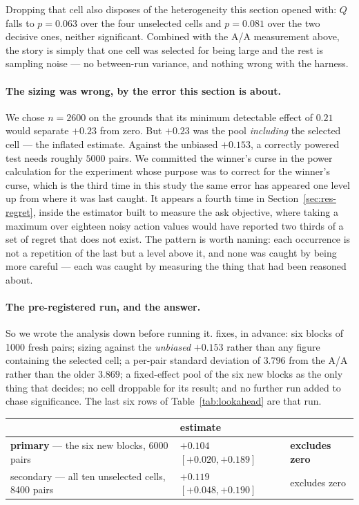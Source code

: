 \documentclass[11pt,letterpaper]{article}
\begin{document}
Dropping that cell also disposes of the heterogeneity this section opened with:
$Q$ falls to $p = 0.063$ over the four unselected cells and $p = 0.081$ over the
two decisive ones, neither significant. Combined with the A/A measurement above,
the story is simply that one cell was selected for being large and the rest is
sampling noise --- no between-run variance, and nothing wrong with the harness.

\paragraph{The sizing was wrong, by the error this section is about.} We
chose $n = 2600$ on the grounds that its minimum detectable effect of $0.21$
would separate $+0.23$ from zero. But $+0.23$ was the pool \emph{including} the
selected cell --- the inflated estimate. Against the unbiased $+0.153$, a
correctly powered test needs roughly $5000$ pairs. We committed the winner's
curse in the power calculation for the experiment whose purpose was to correct
for the winner's curse, which is the third time in this study the same error has
appeared one level up from where it was last caught. It appears a fourth time in
Section~\ref{sec:res-regret}, inside the estimator built to measure the ask
objective, where taking a maximum over eighteen noisy action values would have
reported two thirds of a set of regret that does not exist. The pattern is worth
naming: each occurrence is not a repetition of the last but a level above it,
and none was caught by being more careful --- each was caught by measuring the
thing that had been reasoned about.

\paragraph{The pre-registered run, and the answer.} So we wrote the analysis
down before running it.  fixes, in
advance: six blocks of 1000 fresh pairs; sizing against the \emph{unbiased}
$+0.153$ rather than any figure containing the selected cell; a per-pair
standard deviation of $3.796$ from the A/A rather than the older $3.869$; a
fixed-effect pool of the six new blocks as the only thing that decides; no cell
droppable for its result; and no further run added to chase significance. The
last six rows of Table~\ref{tab:lookahead} are that run.

\begin{center}
\small
\begin{tabular}{lll}
\toprule
& estimate & \\
\midrule
\textbf{primary} --- the six new blocks, 6000 pairs
  & $\mathbf{+0.104}$ $[+0.020, +0.189]$ & \textbf{excludes zero} \\
secondary --- all ten unselected cells, 8400 pairs
  & $+0.119$ $[+0.048, +0.190]$ & excludes zero \\
\bottomrule
\end{tabular}
\end{center}
\end{document}
